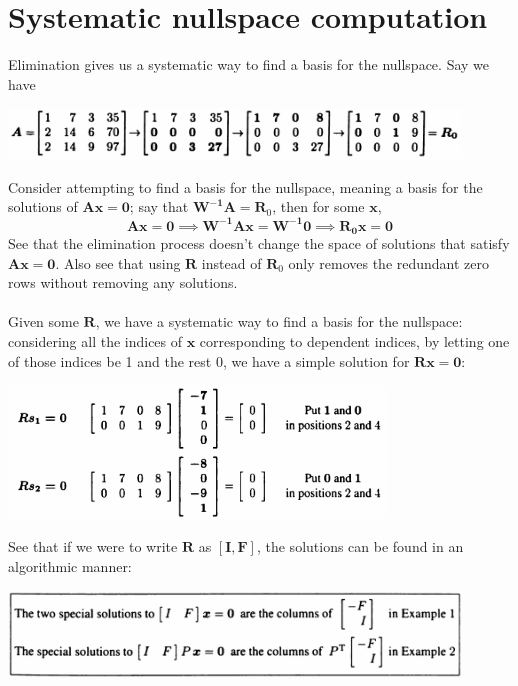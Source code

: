 \documentclass{report}
\begin{document}
\section{Systematic nullspace computation}
Elimination gives us a systematic way to find a basis for the nullspace. Say we have
\begin{center}
\includegraphics[width=12cm]{31}
\end{center}
Consider attempting to find a basis for the nullspace, meaning a basis for the solutions of $\bm{Ax}=\bm0$; say that $\bm{W^{-1}A}=\bm R_0$, then for some $\bm x$,
\begin{equation*}
\bm{Ax}=\bm0\implies\bm{W^{-1}Ax}=\bm{W^{-1}0}\implies\bm{R_0x}=\bm0
\end{equation*}
See that the elimination process doesn't change the space of solutions that satisfy $\bm{Ax}=\bm0$. Also see that using $\bm R$ instead of $\bm R_0$ only removes the 
redundant zero rows without removing any solutions.\\
\vspace{1mm}\\
Given some $\bm R$, we have a systematic way to find a basis for the nullspace: considering all the indices of $\bm x$ corresponding to dependent indices,
by letting one of those indices be 1 and the rest 0, we have a simple solution for $\bm{Rx}=\bm0$:
\begin{center}
\includegraphics[width=10cm]{32}
\end{center}
See that if we were to write $\bm R$ as $[\bm I,\bm F]$, the solutions can be found in an algorithmic manner:
\begin{center}
\includegraphics[width=12cm]{33}
\end{center}
\end{document}
